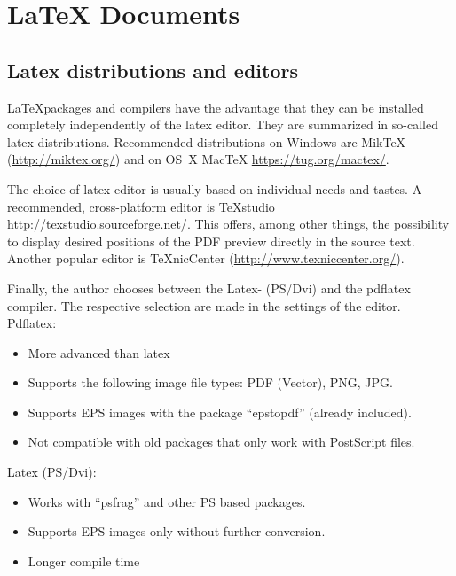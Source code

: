 \chapter[LaTeX ]{LaTeX Documents}

\section{Latex distributions and editors}

\LaTeX packages and compilers have the advantage that they can be installed completely independently of the latex editor.
They are summarized in so-called latex distributions.
Recommended distributions on Windows are MikTeX (\href{http://miktex.org/}{http://miktex.org/}) and on OS~X MacTeX \href{https://tug.org/mactex/}{https://tug.org/mactex/}.

The choice of latex editor is usually based on individual needs and tastes.
A recommended, cross-platform editor is TeXstudio \href{http://texstudio.sourceforge.net/}{http://texstudio.sourceforge.net/}.
This offers, among other things, the possibility to display desired positions of the PDF preview directly in the source text.
Another popular editor is TeXnicCenter (\href{http://www.texniccenter.org/}{http://www.texniccenter.org/}).

Finally, the author chooses between the Latex- (PS/Dvi) and the pdflatex compiler.
The respective selection are made in the settings of the editor. \\

Pdflatex:
\begin{itemize}
	\item More advanced than latex
	\item Supports the following image file types: PDF (Vector), PNG, JPG.
	\item Supports EPS images with the package "`epstopdf"' (already included).
	\item Not compatible with old packages that only work with PostScript files.
\end{itemize}

Latex (PS/Dvi):
\begin{itemize}
	\item Works with "`psfrag"' and other PS based packages.
	\item Supports EPS images only without further conversion.
	\item Longer compile time
\end{itemize}


